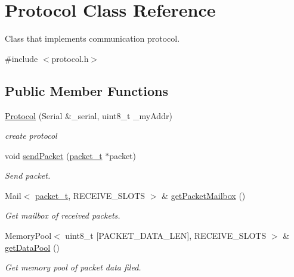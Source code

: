 \hypertarget{classProtocol}{}\section{Protocol Class Reference}
\label{classProtocol}


Class that implements communication protocol.  




{\ttfamily \#include $<$protocol.\+h$>$}

\subsection*{Public Member Functions}
\begin{DoxyCompactItemize}
\item 
\mbox{\label{classProtocol_a162e23813be997fd098f6abeabc33ae2}} 
\hyperlink{classProtocol_a162e23813be997fd098f6abeabc33ae2}{Protocol} (Serial \&\+\_\+serial, uint8\+\_\+t \+\_\+my\+Addr)
\begin{DoxyCompactList}\small\item\em create protocol \end{DoxyCompactList}\item 
void \hyperlink{classProtocol_a916dbbd29a4d74a20a46d1331af1f769}{send\+Packet} (\hyperlink{structpacket__t}{packet\+\_\+t} $\ast$packet)
\begin{DoxyCompactList}\small\item\em Send packet. \end{DoxyCompactList}\item 
Mail$<$ \hyperlink{structpacket__t}{packet\+\_\+t}, R\+E\+C\+E\+I\+V\+E\+\_\+\+S\+L\+O\+TS $>$ \& \hyperlink{classProtocol_a4ba79add81128e7a7e47ed261fdb6023}{get\+Packet\+Mailbox} ()
\begin{DoxyCompactList}\small\item\em Get mailbox of received packets. \end{DoxyCompactList}\item 
Memory\+Pool$<$ uint8\+\_\+t \mbox{[}P\+A\+C\+K\+E\+T\+\_\+\+D\+A\+T\+A\+\_\+\+L\+EN\mbox{]}, R\+E\+C\+E\+I\+V\+E\+\_\+\+S\+L\+O\+TS $>$ \& \hyperlink{classProtocol_a14e37a62910d1e8550e2623ecdf23e7d}{get\+Data\+Pool} ()
\begin{DoxyCompactList}\small\item\em Get memory pool of packet data filed. \end{DoxyCompactList}\end{DoxyCompactItemize}


